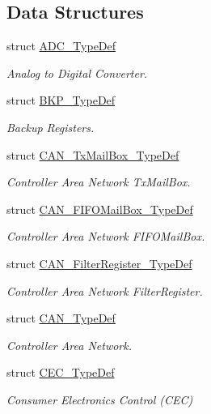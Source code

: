 \subsection*{Data Structures}
\begin{DoxyCompactItemize}
\item 
struct \hyperlink{struct_a_d_c___type_def}{A\-D\-C\-\_\-\-Type\-Def}
\begin{DoxyCompactList}\small\item\em Analog to Digital Converter. \end{DoxyCompactList}\item 
struct \hyperlink{struct_b_k_p___type_def}{B\-K\-P\-\_\-\-Type\-Def}
\begin{DoxyCompactList}\small\item\em Backup Registers. \end{DoxyCompactList}\item 
struct \hyperlink{struct_c_a_n___tx_mail_box___type_def}{C\-A\-N\-\_\-\-Tx\-Mail\-Box\-\_\-\-Type\-Def}
\begin{DoxyCompactList}\small\item\em Controller Area Network Tx\-Mail\-Box. \end{DoxyCompactList}\item 
struct \hyperlink{struct_c_a_n___f_i_f_o_mail_box___type_def}{C\-A\-N\-\_\-\-F\-I\-F\-O\-Mail\-Box\-\_\-\-Type\-Def}
\begin{DoxyCompactList}\small\item\em Controller Area Network F\-I\-F\-O\-Mail\-Box. \end{DoxyCompactList}\item 
struct \hyperlink{struct_c_a_n___filter_register___type_def}{C\-A\-N\-\_\-\-Filter\-Register\-\_\-\-Type\-Def}
\begin{DoxyCompactList}\small\item\em Controller Area Network Filter\-Register. \end{DoxyCompactList}\item 
struct \hyperlink{struct_c_a_n___type_def}{C\-A\-N\-\_\-\-Type\-Def}
\begin{DoxyCompactList}\small\item\em Controller Area Network. \end{DoxyCompactList}\item 
struct \hyperlink{struct_c_e_c___type_def}{C\-E\-C\-\_\-\-Type\-Def}
\begin{DoxyCompactList}\small\item\em Consumer Electronics Control (C\-E\-C) \end{DoxyCompactList}\item 

\end{DoxyCompactItemize}
